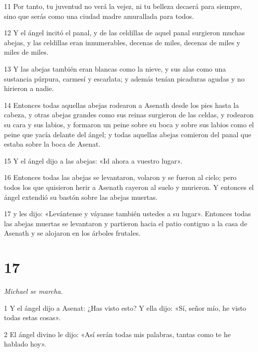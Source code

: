 \par 11 Por tanto, tu juventud no verá la vejez, ni tu belleza decaerá para siempre, sino que serás como una ciudad madre amurallada para todos.

\par 12 Y el ángel incitó el panal, y de las celdillas de aquel panal surgieron muchas abejas, y las celdillas eran innumerables, decenas de miles, decenas de miles y miles de miles.

\par 13 Y las abejas también eran blancas como la nieve, y sus alas como una sustancia púrpura, carmesí y escarlata; y además tenían picaduras agudas y no hirieron a nadie.

\par 14 Entonces todas aquellas abejas rodearon a Asenath desde los pies hasta la cabeza, y otras abejas grandes como sus reinas surgieron de las celdas, y rodearon su cara y sus labios, y formaron un peine sobre su boca y sobre sus labios como el peine que yacía delante del ángel; y todas aquellas abejas comieron del panal que estaba sobre la boca de Asenat.

\par 15 Y el ángel dijo a las abejas: «Id ahora a vuestro lugar».

\par 16 Entonces todas las abejas se levantaron, volaron y se fueron al cielo; pero todos los que quisieron herir a Asenath cayeron al suelo y murieron. Y entonces el ángel extendió su bastón sobre las abejas muertas.

\par 17 y les dijo: «Levántense y váyanse también ustedes a su lugar». Entonces todas las abejas muertas se levantaron y partieron hacia el patio contiguo a la casa de Asenath y se alojaron en los árboles frutales.

\chapter{17}

\par \textit{Michael se marcha.}

\par 1 Y el ángel dijo a Asenat: ¿Has visto esto? Y ella dijo: «Sí, señor mío, he visto todas estas cosas».

\par 2 El ángel divino le dijo: «Así serán todas mis palabras, tantas como te he hablado hoy».

